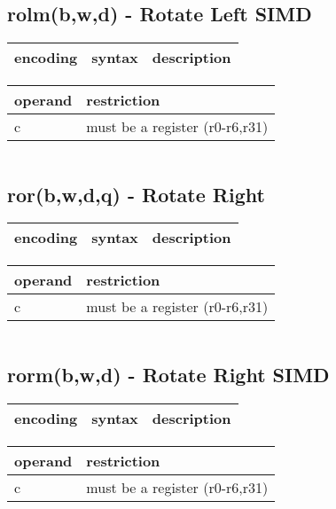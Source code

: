 \documentclass[letterpaper,10pt,openright,twoside,onecolumn]{book}
\begin{document}
\newpage\subsection{rolm(b,w,d) - Rotate Left SIMD}
  \begin{tabular}{|l|l|l|}
   \hline
    encoding & syntax & description \\
   \hline
   \hline
  \end{tabular}
  \flushleft
  \begin{tabular}{|l|l|}
   \hline
    operand & restriction \\
   \hline
    c & must be a register (r0-r6,r31) \\
   \hline
  \end{tabular}
  \begin{verbatim}
  \end{verbatim}
\newpage\subsection{ror(b,w,d,q) - Rotate Right}
  \begin{tabular}{|l|l|l|}
   \hline
    encoding & syntax & description \\
   \hline
   \hline
  \end{tabular}
  \flushleft
  \begin{tabular}{|l|l|}
   \hline
    operand & restriction \\
   \hline
    c & must be a register (r0-r6,r31) \\
   \hline
  \end{tabular}
  \begin{verbatim}
  \end{verbatim}
\newpage\subsection{rorm(b,w,d) - Rotate Right SIMD}
  \begin{tabular}{|l|l|l|}
   \hline
    encoding & syntax & description \\
   \hline
   \hline
  \end{tabular}
  \flushleft
  \begin{tabular}{|l|l|}
   \hline
    operand & restriction \\
   \hline
    c & must be a register (r0-r6,r31) \\
   \hline
  \end{tabular}
  \begin{verbatim}
  \end{verbatim}
\end{document}

